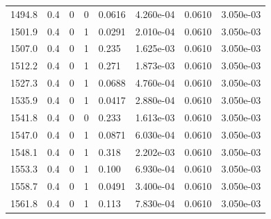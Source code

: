 \documentclass[preview]{standalone}
\begin{document}
{{{{{{{\begin{tabular}{L{1.2cm}C{1.2cm} C{0.3cm}C{0.5cm} C{1.4cm}C{1.4cm} C{1.4cm}C{1.4cm}}
  1494.8  &   0.4  & 0     &  0 &  0.0616  & 4.260e-04  & 0.0610 &  3.050e-03   \\ 
  1501.9  &   0.4  & 0     &  1 &  0.0291  & 2.010e-04  & 0.0610 &  3.050e-03   \\ 
  1507.0  &   0.4  & 0     &  1 &  0.235  & 1.625e-03  & 0.0610 &  3.050e-03   \\ 
  1512.2  &   0.4  & 0     &  1 &  0.271  & 1.873e-03  & 0.0610 &  3.050e-03   \\ 
  1527.3  &   0.4  & 0     &  1 &  0.0688  & 4.760e-04  & 0.0610 &  3.050e-03   \\ 
  1535.9  &   0.4  & 0     &  1 &  0.0417  & 2.880e-04  & 0.0610 &  3.050e-03   \\ 
  1541.8  &   0.4  & 0     &  0 &  0.233  & 1.613e-03  & 0.0610 &  3.050e-03   \\ 
  1547.0  &   0.4  & 0     &  1 &  0.0871  & 6.030e-04  & 0.0610 &  3.050e-03   \\ 
  1548.1  &   0.4  & 0     &  1 &  0.318  & 2.202e-03  & 0.0610 &  3.050e-03   \\ 
  1553.3  &   0.4  & 0     &  1 &  0.100  & 6.930e-04  & 0.0610 &  3.050e-03   \\ 
  1558.7  &   0.4  & 0     &  1 &  0.0491  & 3.400e-04  & 0.0610 &  3.050e-03   \\ 
  1561.8  &   0.4  & 0     &  1 &  0.113  & 7.830e-04  & 0.0610 &  3.050e-03   \\ 
\hline 
\end{tabular} 

}}}}}}}
\end{document}

